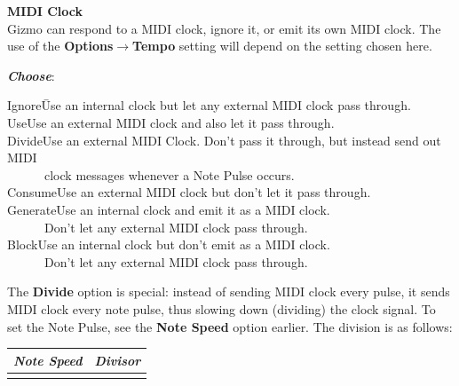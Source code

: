 \documentclass{article}
\begin{document}
\begin{description}
	\item{\bf MIDI Clock}\\
		Gizmo can respond to a MIDI clock, ignore it, or emit its own MIDI clock.  The use of the {\bf Options\(\boldsymbol\rightarrow\)Tempo} setting will depend on the setting chosen here.
		\begin{description}
			\item{\bf \textit{Choose}}:
			\begin{tabbing}
			Ignore\hspace{0.5in}\=Use an internal clock but let any external MIDI clock pass through.\\
			Use\>Use an external MIDI clock and also let it pass through.\\
			Divide\>Use an external MIDI Clock.  Don't pass it through, but instead send out MIDI\\
			\>~~~~~~clock messages whenever a Note Pulse occurs.\\
			Consume\>Use an external MIDI clock but don't let it pass through.\\
			Generate\>Use an internal clock and emit it as a MIDI clock.\\
			\>~~~~~~Don't let any external MIDI clock pass through.\\	
			Block\>Use an internal clock but don't emit as a MIDI clock.\\
			\>~~~~~~Don't let any external MIDI clock pass through.\\
			\end{tabbing}
		\end{description}

The {\bf Divide} option is special: instead of sending MIDI clock every pulse, it sends MIDI clock every note pulse, thus slowing down (dividing) the clock signal.  To set the Note Pulse, see the {\bf Note Speed} option earlier.  The division is as follows:

\begin{center}\begin{tabular}{@{}lr@{}}
{\it Note Speed}&{\it Divisor}\\
				\hline\\[-0.9em]


\end{tabular}
\end{center}
\end{description}
\end{document}
